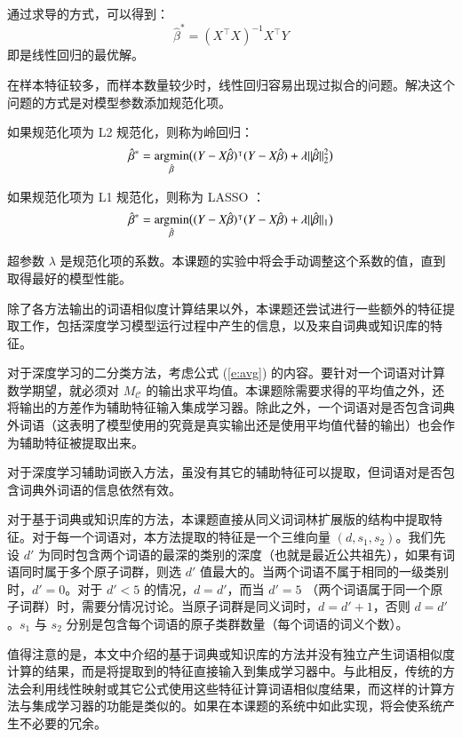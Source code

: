 通过求导的方式，可以得到：
\begin{equation}
\hat{\beta}^* = (X^\intercal X)^{-1} X^\intercal Y
\end{equation}
即是线性回归的最优解。

在样本特征较多，而样本数量较少时，线性回归容易出现过拟合的问题。解决这个问题的方式是对模型参数添加规范化项。

如果规范化项为 L2 规范化，则称为岭回归：
\begin{equation}
\hat{\beta}^* = \operatorname*{argmin}_{\hat{\beta}} \bigl((Y - X \hat{\beta})^\intercal (Y - X \hat{\beta}) + \lambda ||\hat{\beta}||^2_2\bigr)
\end{equation}

如果规范化项为 L1 规范化，则称为 LASSO ：
\begin{equation}
\hat{\beta}^* = \operatorname*{argmin}_{\hat{\beta}} \bigl((Y - X \hat{\beta})^\intercal (Y - X \hat{\beta}) + \lambda ||\hat{\beta}||_1\bigr)
\end{equation}

超参数 $\lambda$ 是规范化项的系数。本课题的实验中将会手动调整这个系数的值，直到取得最好的模型性能。

\label{s:ensemble features}
除了各方法输出的词语相似度计算结果以外，本课题还尝试进行一些额外的特征提取工作，包括深度学习模型运行过程中产生的信息，以及来自词典或知识库的特征。

对于深度学习的二分类方法，考虑公式 (\ref{e:avg}) 的内容。要针对一个词语对计算数学期望，就必须对 $M_\mathcal{C}$ 的输出求平均值。本课题除需要求得的平均值之外，还将输出的方差作为辅助特征输入集成学习器。除此之外，一个词语对是否包含词典外词语（这表明了模型使用的究竟是真实输出还是使用平均值代替的输出）也会作为辅助特征被提取出来。

对于深度学习辅助词嵌入方法，虽没有其它的辅助特征可以提取，但词语对是否包含词典外词语的信息依然有效。

对于基于词典或知识库的方法，本课题直接从同义词词林扩展版的结构中提取特征。对于每一个词语对，本方法提取的特征是一个三维向量 $(d, s_1, s_2)$。我们先设 $d'$ 为同时包含两个词语的最深的类别的深度（也就是最近公共祖先），如果有词语同时属于多个原子词群，则选 $d'$ 值最大的。当两个词语不属于相同的一级类别时，$d' = 0$。对于 $d' < 5$ 的情况，$d = d'$，而当 $d' = 5$ （两个词语属于同一个原子词群）时，需要分情况讨论。当原子词群是同义词时，$d = d' + 1$，否则 $d = d'$。$s_1$ 与 $s_2$ 分别是包含每个词语的原子类群数量（每个词语的词义个数）。

值得注意的是，本文中介绍的基于词典或知识库的方法并没有独立产生词语相似度计算的结果，而是将提取到的特征直接输入到集成学习器中。与此相反，传统的方法会利用线性映射或其它公式使用这些特征计算词语相似度结果，而这样的计算方法与集成学习器的功能是类似的。如果在本课题的系统中如此实现，将会使系统产生不必要的冗余。

